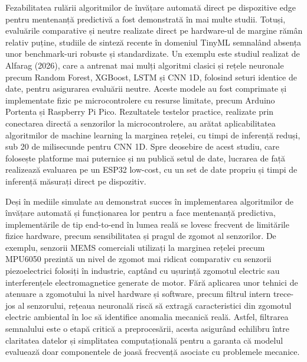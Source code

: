 	Fezabilitatea rulării algoritmilor de învățare automată direct pe dispozitive edge pentru mentenanță predictivă a fost demonstrată în mai multe studii. \cite{gupta2025embedded, bala2024artificial} Totuși, evaluările comparative și neutre realizate direct pe hardware-ul de margine rămân relativ puține, studiile de sinteză recente în domeniul TinyML semnalând absența unor benchmark-uri robuste și standardizate. \cite{alharthi2026tinyml, somvanshi2025tiny} Un exemplu este studiul realizat de Alfarag (2026), care a antrenat mai mulți algoritmi clasici și rețele neuronale precum Random Forest, XGBoost, LSTM și CNN 1D, folosind seturi identice de date, pentru asigurarea evaluării neutre. \cite{alfarag3embedded} Aceste modele au fost comprimate și implementate fizic pe microcontrolere cu resurse limitate, precum Arduino Portenta și Raspberry Pi Pico. \cite{alfarag3embedded} Rezultatele testelor practice, realizate prin conectarea directă a senzorilor la microcontrolere, au arătat aplicabilitatea algoritmilor de machine learning la marginea rețelei, cu timpi de inferență reduși, sub 20 de milisecunde pentru CNN 1D. \cite{alfarag3embedded} Spre deosebire de acest studiu, care folosește platforme mai puternice și nu publică setul de date, lucrarea de față realizează evaluarea pe un ESP32 low-cost, cu un set de date propriu și timpi de inferență măsurați direct pe dispozitiv.
	
	Deși în mediile simulate au demonstrat succes în implementarea algoritmilor de învățare automată și funcționarea lor pentru a face mentenanță predictiva, implementările de tip end-to-end în lumea reală se lovesc frecvent de limitările fizice hardware, precum sensibilitatea și pragul de zgomot al senzorilor. De exemplu, senzorii MEMS comerciali utilizați la marginea rețelei precum MPU6050 prezintă un nivel de zgomot mai ridicat comparativ cu senzorii piezoelectrici folosiți în industrie, captând cu ușurință zgomotul electric sau interferențele electromagnetice generate de motor. Fără aplicarea unor tehnici de atenuare a zgomotului la nivel hardware și software, precum filtrul intern trece-jos al senzorului, rețeaua neuronală riscă să extragă caracteristici din zgomotul electric ambiental în loc să identifice anomalia mecanică reală. Astfel, filtrarea semnalului este o etapă critică a preprocesării, acesta asigurând echilibru între claritatea datelor și simplitatea computațională pentru a garanta că modelul evaluează doar componentele de joasă frecvență asociate cu problemele mecanice. \cite{kolok2025low}
	
